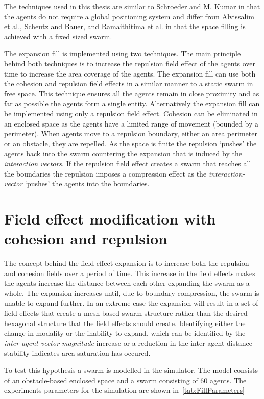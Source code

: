 The techniques used in this thesis are similar to Schroeder and M. Kumar in that the agents do not require a global positioning system and differ from Alvissalim et al., Scheutz and Bauer, and Ramaithitima et al. in that the space filling is achieved with a fixed sized swarm. 

The expansion fill is implemented using two techniques. The main principle behind both techniques is to increase the repulsion field effect of the agents over time to increase the area coverage of the agents. The expansion fill can use both the cohesion and repulsion field effects in a similar manner to a static swarm in free space. This technique ensures all the agents remain in close proximity and as far as possible the agents form a single entity. Alternatively the expansion fill can be implemented using only a repulsion field effect. Cohesion can be eliminated in an enclosed space as the agents have a limited range of movement (bounded by a perimeter). When agents move to a repulsion boundary, either an area perimeter or an obstacle, they are repelled. As the space is finite the repulsion `pushes' the agents back into the swarm countering the expansion that is induced by the \textit{interaction vectors}. If the repulsion field effect creates a swarm that reaches all the boundaries the repulsion imposes a compression effect as the \textit{interaction-vector} `pushes' the agents into the boundaries. 

\section{Field effect modification with cohesion and repulsion}
The concept behind the field effect expansion is to increase both the repulsion and cohesion fields over a period of time. This increase in the field effects makes the agents increase the distance between each other expanding the swarm as a whole. The expansion increases until, due to boundary compression, the swarm is unable to expand further. In an extreme case the expansion will result in a set of field effects that create a mesh based swarm structure rather than the desired hexagonal structure that the field effects should create. Identifying either the change in modality or the inability to expand, which can be identified by the \textit{inter-agent vector magnitude} increase or a reduction in the inter-agent distance stability indicates area saturation has occured.

To test this hypothesis a swarm is modelled in the simulator. The model consists of an obstacle-based enclosed space and a swarm consisting of 60 agents. The experiments parameters for the simulation are shown in~\autoref{tab:FillParameters}

